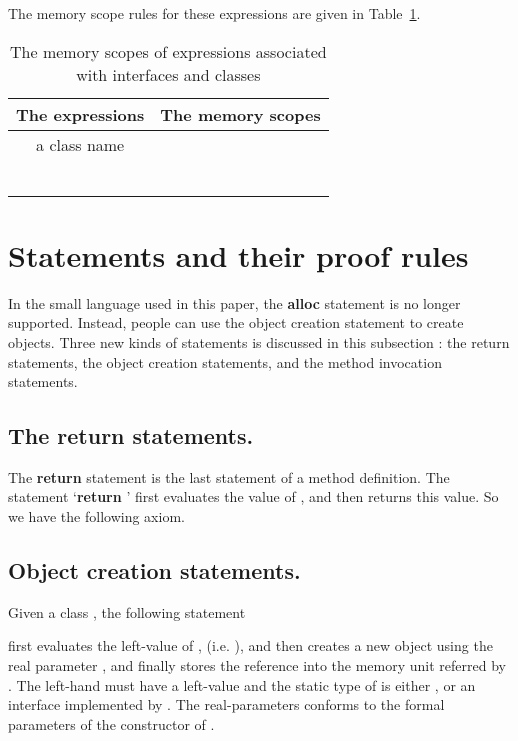 \documentclass[fleqn]{llncs}
\begin{document}
The memory scope rules for these expressions are given in Table~\ref{TAB-MEMORY-SCOPE}.
\begin{table}
\begin{center}
\begin{tabular}{|c|c|}
  \hline
  The expressions & The memory scopes\\
  \hline
  a class name &  \\
  \hline
   &  \\
  \hline
   &  \\
  \hline
   &  \\
  \hline
   & \\
  \hline
   &  \\
  \hline
    &  \\
  \hline
\end{tabular}
\end{center}
\caption{The memory scopes of expressions associated with interfaces and classes}\label{TAB-MEMORY-SCOPE}
\end{table}


\section{Statements and their proof rules}\label{SEC-STATEMENT}
In the small language used in this paper, the \textbf{alloc} statement is no longer supported.
Instead, people can use the object creation statement to create objects. Three new kinds of statements is discussed in this subsection : the return statements, the object creation statements, and the method invocation statements.

\subsection{The return statements.}
The \textbf{return} statement is the last statement of a method definition. The statement `\textbf{return} ' first evaluates the value of , and then returns
this value. So we have the following axiom.


\subsection{Object creation statements.}
Given a class , the following statement
        
first evaluates the left-value of , (i.e. ), and then creates a new object using the real parameter ,
and finally stores the reference into the memory unit referred by . The left-hand  must have a left-value and the
static type of  is either , or an interface  implemented by . The real-parameters  conforms to the
formal parameters of the constructor of .
\end{document}

